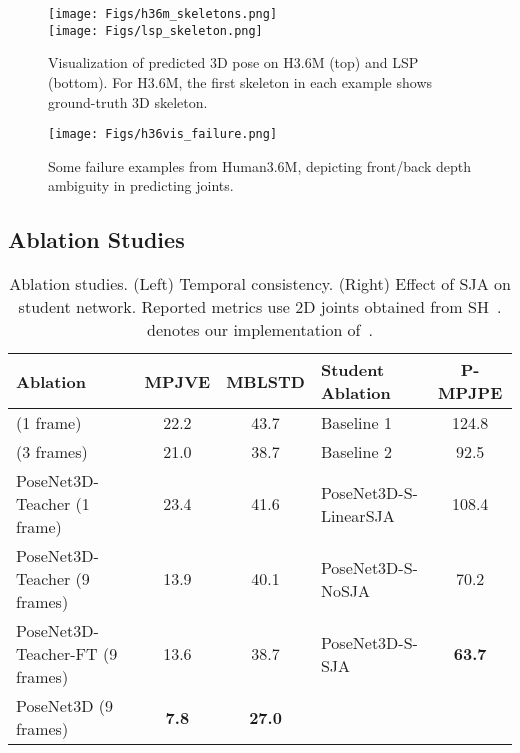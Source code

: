 \documentclass[10pt,twocolumn,letterpaper]{article}
\begin{document}
\begin{figure}[htb]
	\centering
	\texttt{[image: Figs/h36m\_skeletons.png]} \\
	\texttt{[image: Figs/lsp\_skeleton.png]}
	\vspace{-2ex}
	\caption{Visualization of predicted 3D pose on H3.6M (top) and LSP (bottom). For H3.6M, the first skeleton in each example shows ground-truth 3D skeleton.}
	\label{fig:h36vis_skeleton}
	\vspace{-3ex}
\end{figure}

\begin{figure}
	\centering
	\texttt{[image: Figs/h36vis\_failure.png]} \\
	\vspace{-1ex}
	\caption{Some failure examples from Human3.6M, depicting front/back depth ambiguity in predicting joints.}
	\label{fig:h36vis_mesh_failure}
	\vspace{-3ex}
\end{figure}



 




\subsection{Ablation Studies}
\label{subsec:ablation_student}


\begin{table}[tb!]
	\centering
	\setlength{\tabcolsep}{2pt}
	\begin{adjustbox}{max width=0.99\linewidth}
		\begin{tabular}{lcc||lc}\toprule
			Ablation & MPJVE & MBLSTD & Student Ablation & P-MPJPE\\
			\midrule 
			\cite{chingCVPR2019} (1 frame)  & 22.2 & 43.7 & 	Baseline 1 &  124.8  \\
			\cite{chingCVPR2019} (3 frames)  & 21.0 & 38.7 & 	Baseline 2 &  92.5   \\
			
			PoseNet3D-Teacher (1 frame) &  23.4 & 41.6 & 	PoseNet3D-S-LinearSJA  & 108.4    \\
			PoseNet3D-Teacher (9 frames) &  {13.9} &{40.1} & 	PoseNet3D-S-NoSJA  & 70.2  \\
			PoseNet3D-Teacher-FT (9 frames) &  {13.6} & {38.7} & 	PoseNet3D-S-SJA    & \textbf{63.7}\\
			PoseNet3D (9 frames) &  \textbf{7.8} & \textbf{27.0} \\
			
			\bottomrule
		\end{tabular}\end{adjustbox}
	\vspace{-1ex}
	\caption{Ablation studies. (Left) Temporal consistency. (Right) Effect of SJA on student network. Reported metrics use 2D joints obtained from SH~\cite{stacked-hourglass}.  denotes our implementation of~\cite{chingCVPR2019}.
	}
	\label{table:combined-ablation}
	\vspace{-3ex}
\end{table}   
\end{document}
